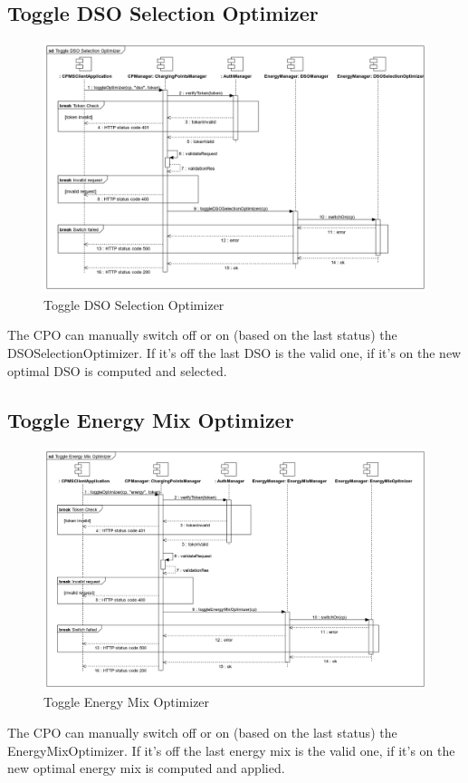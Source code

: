 \documentclass{Configuration_Files/PoliMi3i_thesis}
\begin{document}
\subsection{Toggle DSO Selection Optimizer}
\begin{figure}[H]
    \centering
    \includegraphics[width=1\textwidth]{Images/sequenceDiagrams/Toggle DSO Selection Optimizer.jpg}
    \caption{Toggle DSO Selection Optimizer}
\end{figure}
The CPO can manually switch off or on (based on the last status) the DSOSelectionOptimizer. If it's off the last DSO is the valid one, if it's on the new optimal DSO is computed and selected.

\subsection{Toggle Energy Mix Optimizer}
\begin{figure}[H]
    \centering
    \includegraphics[width=1\textwidth]{Images/sequenceDiagrams/Toggle Energy Mix Optimizer.jpg}
    \caption{Toggle Energy Mix Optimizer}
\end{figure}
The CPO can manually switch off or on (based on the last status) the EnergyMixOptimizer. If it's off the last energy mix is the valid one, if it's on the new optimal energy mix is computed and applied.
\end{document}
